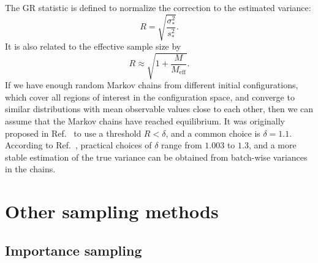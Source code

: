 The GR statistic is defined to normalize the correction to the estimated variance:
\begin{equation}
R = \sqrt{\frac{\sigma^2_*}{s^2_*}}.
\end{equation}
It is also related to the effective sample size by
\begin{equation}
R \approx \sqrt{1 + \frac{M}{M_\text{eff}}}.
\end{equation}
If we have enough random Markov chains from different initial configurations, which cover all regions of interest in the configuration space, and converge to similar distributions with mean observable values close to each other, then we can assume that the Markov chains have reached equilibrium. It was originally proposed in Ref.~\cite{gelman1992inference} to use a threshold $R < \delta$, and a common choice is $\delta = 1.1$. According to Ref.~\cite{vats2021revisiting}, practical choices of $\delta$ range from $1.003$ to $1.3$, and a more stable estimation of the true variance can be obtained from batch-wise variances in the chains.

\section{Other sampling methods}
\label{sec:more-sampling}

\subsection{Importance sampling}
\label{sec:importance-sampling}


